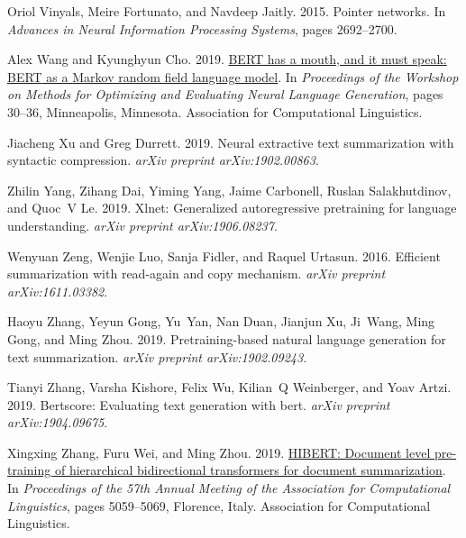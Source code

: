 \documentclass[11pt,a4paper]{article}
\begin{document}
\begin{thebibliography}{46}
Oriol Vinyals, Meire Fortunato, and Navdeep Jaitly. 2015.
\newblock Pointer networks.
\newblock In \emph{Advances in Neural Information Processing Systems}, pages
  2692--2700.

Alex Wang and Kyunghyun Cho. 2019.
\newblock \href {https://doi.org/10.18653/v1/W19-2304} {{BERT} has a mouth, and
  it must speak: {BERT} as a {M}arkov random field language model}.
\newblock In \emph{Proceedings of the Workshop on Methods for Optimizing and
  Evaluating Neural Language Generation}, pages 30--36, Minneapolis, Minnesota.
  Association for Computational Linguistics.

Jiacheng Xu and Greg Durrett. 2019.
\newblock Neural extractive text summarization with syntactic compression.
\newblock \emph{arXiv preprint arXiv:1902.00863}.

Zhilin Yang, Zihang Dai, Yiming Yang, Jaime Carbonell, Ruslan Salakhutdinov,
  and Quoc~V Le. 2019.
\newblock Xlnet: Generalized autoregressive pretraining for language
  understanding.
\newblock \emph{arXiv preprint arXiv:1906.08237}.

Wenyuan Zeng, Wenjie Luo, Sanja Fidler, and Raquel Urtasun. 2016.
\newblock Efficient summarization with read-again and copy mechanism.
\newblock \emph{arXiv preprint arXiv:1611.03382}.

Haoyu Zhang, Yeyun Gong, Yu~Yan, Nan Duan, Jianjun Xu, Ji~Wang, Ming Gong, and
  Ming Zhou. 2019{}.
\newblock Pretraining-based natural language generation for text summarization.
\newblock \emph{arXiv preprint arXiv:1902.09243}.

Tianyi Zhang, Varsha Kishore, Felix Wu, Kilian~Q Weinberger, and Yoav Artzi.
  2019{}.
\newblock Bertscore: Evaluating text generation with bert.
\newblock \emph{arXiv preprint arXiv:1904.09675}.

Xingxing Zhang, Furu Wei, and Ming Zhou. 2019{}.
\newblock \href {https://www.aclweb.org/anthology/P19-1499} {{HIBERT}: Document
  level pre-training of hierarchical bidirectional transformers for document
  summarization}.
\newblock In \emph{Proceedings of the 57th Annual Meeting of the Association
  for Computational Linguistics}, pages 5059--5069, Florence, Italy.
  Association for Computational Linguistics.

\end{thebibliography}
\end{document}
